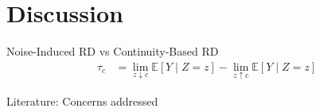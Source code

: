 \section{Discussion}
    
    \frame{\sectionpage}

    \begin{frame}{Noise-Induced RD vs Continuity-Based RD}
        \begin{align*}
            \tau_c &= \lim_{z\downarrow c}\mathbb{E}\left[Y\mid Z=z\right] - \lim_{z\uparrow c} \mathbb{E}\left[ Y\mid Z=z \right]
        \end{align*}

        
    \end{frame}
    
    \begin{frame}{Literature: Concerns addressed}
        
    \end{frame}

    